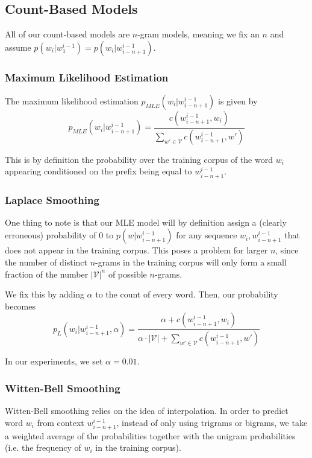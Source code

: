 \documentclass[11pt]{article}
\begin{document}
\subsection{Count-Based Models}

All of our count-based models are $n$-gram models, meaning we fix an $n$ and assume $p(w_i|w^{i-1}_1) = p(w_i|w^{i-1}_{i-n+1})$. 

\subsubsection{Maximum Likelihood Estimation}

The maximum likelihood estimation $p_{MLE}(w_i|w^{i-1}_{i-n+1})$ is given by 
$$p_{MLE}(w_i|w^{i-1}_{i-n+1}) = \frac{c(w^{i-1}_{i-n+1}, w_i)}{\sum_{w' \in \mathcal{V}} c(w^{i-1}_{i-n+1}, w')}$$

This is by definition the probability over the training corpus of the word $w_i$ appearing conditioned on the prefix being equal to $w^{i-1}_{i-n+1}$. 

\subsubsection{Laplace Smoothing}

 One thing to note is that our MLE model will by definition assign a (clearly erroneous) probability of $0$ to $p(w|w^{i-1}_{i-n+1})$ for any sequence $w_i, w^{i-1}_{i-n+1}$ that does not appear in the training corpus. This poses a problem for larger $n$, since the number of distinct $n$-grams in the training corpus will only form a small fraction of the number $|\mathcal{V}|^n$ of possible $n$-grams.

We fix this by adding $\alpha$ to the count of every word. Then, our probability becomes 
$$p_L(w_i|w^{i-1}_{i-n+1}, \alpha) = \frac{\alpha + c(w^{i-1}_{i-n+1}, w_i)}{\alpha \cdot |\mathcal{V}| + \sum_{w' \in \mathcal{V}} c(w^{i-1}_{i-n+1}, w')}$$

In our experiments, we set $\alpha = 0.01$. 

\subsubsection{Witten-Bell Smoothing}

Witten-Bell smoothing relies on the idea of interpolation. In order to predict word $w_i$ from context $w_{i-n+1}^{i-1}$, instead of only using trigrams or bigrams, we take a weighted average of the probabilities together with the unigram probabilities (i.e. the frequency of $w_i$ in the training corpus).
\end{document}
